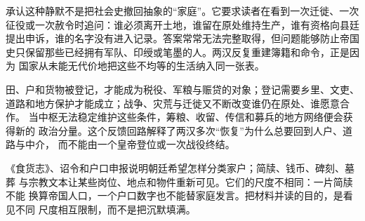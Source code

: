承认这种静默不是把社会史撤回抽象的“家庭”。它要求读者在看到一次迁徙、一次
征役或一次赦令时追问：谁必须离开土地，谁留在原处维持生产，谁有资格向县廷
提出申诉，谁的名字没有进入记录。答案常常无法完整取得，但问题能够防止帝国
史只保留那些已经拥有军队、印绶或笔墨的人。两汉反复重建簿籍和命令，正是因为
国家从未能无代价地把这些不均等的生活纳入同一张表。

\begin{causalchain}[一户人家的压力怎样进入帝国史]
田、户和货物被登记，才能成为税役、军粮与赈贷的对象；登记需要乡里、文吏、
道路和地方保护才能成立；战争、灾荒与迁徙又不断改变谁仍在原处、谁愿意合作。
当中枢无法稳定维护这些条件，筹粮、收留、传信和募兵的地方网络便会获得新的
政治分量。这个反馈回路解释了两汉多次“恢复”为什么总要回到人户、道路与中介，
而不能由一个皇帝登位或一次战役终结。
\end{causalchain}

\begin{textwindow}[社会材料留下的不是全景照片]
《食货志》、诏令和户口申报说明朝廷希望怎样分类家户；简牍、钱币、碑刻、墓葬
与宗教文本让某些岗位、地点和物件重新可见。它们的尺度不相同：一片简牍不能
换算帝国人口，一个户口数字也不能替家庭发言。把材料并读的目的，是看见不同
尺度相互限制，而不是把沉默填满。
\end{textwindow}
